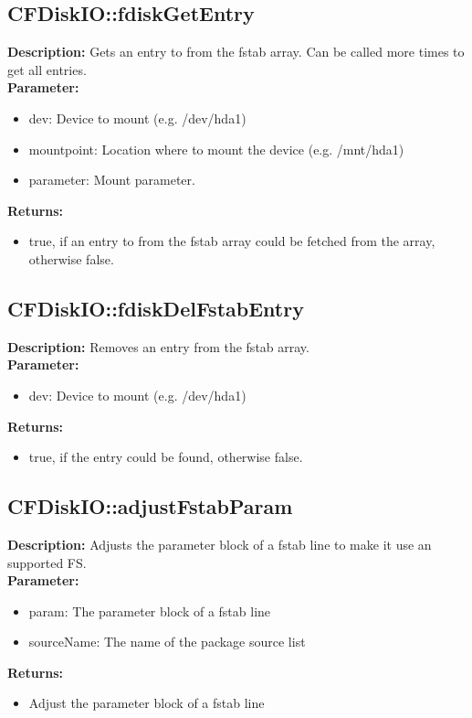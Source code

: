 \subsection{CFDiskIO::fdiskGetEntry}
\textbf{Description:} Gets an entry to from the fstab array. Can be called more times to get all entries.\\
\textbf{Parameter:}
\begin{itemize}
\item dev: Device to mount (e.g. /dev/hda1)
\item mountpoint: Location where to mount the device (e.g. /mnt/hda1)
\item parameter: Mount parameter.
\end{itemize}
\textbf{Returns:}
\begin{itemize}
\item true, if an entry to from the fstab array could be fetched from the array, otherwise false.
\end{itemize}

\subsection{CFDiskIO::fdiskDelFstabEntry}
\textbf{Description:} Removes an entry from the fstab array.\\
\textbf{Parameter:}
\begin{itemize}
\item dev: Device to mount (e.g. /dev/hda1)
\end{itemize}
\textbf{Returns:}
\begin{itemize}
\item true, if the entry could be found, otherwise false.
\end{itemize}

\subsection{CFDiskIO::adjustFstabParam}
\textbf{Description:} Adjusts the parameter block of a fstab line to make it use an supported FS.\\
\textbf{Parameter:}
\begin{itemize}
\item param: The parameter block of a fstab line
\item sourceName: The name of the package source list
\end{itemize}
\textbf{Returns:}
\begin{itemize}
\item Adjust the parameter block of a fstab line
\end{itemize}

